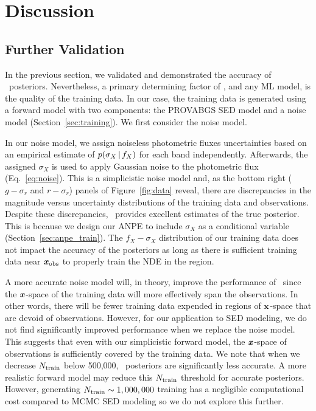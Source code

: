 \section{Discussion} \label{sec:discuss}
\subsection{Further Validation} 
In the previous section, we validated and demonstrated the accuracy of
\sedflow~posteriors. 
Nevertheless, a primary determining factor of \sedflow, and any ML model, is
the quality of the training data.
In our case, the training data is generated using a forward model with two
components: the PROVABGS SED model and a noise model
(Section~\ref{sec:training}).
We first consider the noise model. 

In our noise model, we assign noiseless photometric fluxes uncertainties based
on an empirical estimate of $p(\sigma_X\,|\, f_X)$ for each band
independently. 
Afterwards, the assigned $\sigma_X$ is used to apply Gaussian noise to the
photometric flux (Eq.~\ref{eq:noise}). 
This is a simplicistic noise model and, as the bottom right ($g - \sigma_r$ and
$r - \sigma_r$) panels of Figure~\ref{fig:data} reveal, there are discrepancies
in the magnitude versus uncertainty distributions of the training data and
observations. 
Despite these discrepancies, \sedflow~provides excellent estimates of the true
posterior.  
This is because we design our ANPE to include $\sigma_X$ as a conditional
variable (Section~\ref{sec:anpe_train}).
The $f_X-\sigma_X$ distribution of our training data does not impact the
accuracy of the posteriors as long as there is sufficient training data near
$\textbf{\textit{x}}_{\rm obs}$ to properly train the NDE in the region.

A more accurate noise model will, in theory, improve the performance of
\sedflow~since the $\textbf{\textit{x}}$-space of the training data will more effectively
span the observations. 
In other words, there will be fewer training data expended in regions of 
${\bf x}$-space that are devoid of observations.  
However, for our application to SED modeling, we do not find significantly  
improved performance when we replace the noise model.
This suggests that even with our simplicistic forward model, the
$\textbf{\textit{x}}$-space of observations is sufficiently covered by the training data. 
We note that when we decrease $N_{\rm train}$ below 500,000,
\sedflow~posteriors are significantly less accurate. 
A more realistic forward model may reduce this $N_{\rm train}$ threshold for
accurate posteriors. 
However, generating $N_{\rm train} \sim 1,000,000$ training has a negligible
computational cost compared to MCMC SED modeling so we do not explore this
further. 

